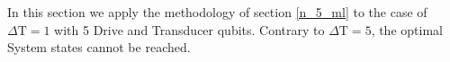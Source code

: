 In this section we apply the methodology of section \ref{n_5_ml} to the case of $\Delta \mathrm{T} = 1$ with 5 Drive and Transducer qubits.
Contrary to $\Delta \mathrm{T} = 5$, the optimal System states cannot be reached.